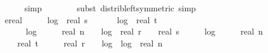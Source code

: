 \begin{isabellebody}
\ \ \ \ \ \ \isamarkupfalse%
\ {\isacharparenleft}{\kern0pt}simp{\isacharparenright}{\kern0pt}\isanewline
\ \ \ \ \ \ \isamarkupfalse%
\ {\isacharparenleft}{\kern0pt}subst\ distrib{\isacharunderscore}{\kern0pt}left{\isacharbrackleft}{\kern0pt}symmetric{\isacharbrackright}{\kern0pt}{\isacharcomma}{\kern0pt}\ simp{\isacharparenright}{\kern0pt}\ \isanewline
\ \ \ \ \isamarkupfalse%
\ \isamarkupfalse%
\ {\isachardoublequoteopen}{\isachardot}{\kern0pt}{\isachardot}{\kern0pt}{\isachardot}{\kern0pt}\ {\isasymle}\ ereal\ {\isacharparenleft}{\kern0pt}\ {}\ {\isacharplus}{\kern0pt}\ {}\ {\isacharasterisk}{\kern0pt}\ log\ {}\ {\isacharparenleft}{\kern0pt}real\ s\ {\isacharplus}{\kern0pt}\ {}{\isacharparenright}{\kern0pt}\ \ {\isacharplus}{\kern0pt}\ {}\ {\isacharasterisk}{\kern0pt}\ log\ {}\ {\isacharparenleft}{\kern0pt}real\ t\ {\isacharplus}{\kern0pt}\ {}{\isacharparenright}{\kern0pt}\ {\isacharplus}{\kern0pt}\ \isanewline
\ \ \ \ \ \ {}\ {\isacharasterisk}{\kern0pt}\ log\ {}\ {\isacharparenleft}{\kern0pt}{}\ {\isacharasterisk}{\kern0pt}\ {\isacharparenleft}{\kern0pt}{}{}\ {\isacharplus}{\kern0pt}\ real\ n{\isacharparenright}{\kern0pt}{\isacharparenright}{\kern0pt}\ {\isacharplus}{\kern0pt}\ {}\ {\isacharasterisk}{\kern0pt}\ log\ {}\ {\isacharparenleft}{\kern0pt}real\ r\ {\isacharplus}{\kern0pt}\ {}{\isacharparenright}{\kern0pt}\ {\isacharplus}{\kern0pt}\ real\ s\ {\isacharasterisk}{\kern0pt}\ {\isacharparenleft}{\kern0pt}{}\ {\isacharplus}{\kern0pt}\ {}\ {\isacharasterisk}{\kern0pt}\ log\ {}\ {\isacharparenleft}{\kern0pt}{}\ {\isacharasterisk}{\kern0pt}\ {\isacharparenleft}{\kern0pt}{}{}\ {\isacharplus}{\kern0pt}\ real\ n{\isacharparenright}{\kern0pt}{\isacharparenright}{\kern0pt}\ {\isacharplus}{\kern0pt}\ \isanewline
\ \ \ \ \ \ real\ t\ {\isacharasterisk}{\kern0pt}\ {\isacharparenleft}{\kern0pt}{}{}\ {\isacharplus}{\kern0pt}\ {\isacharparenleft}{\kern0pt}{}\ {\isacharasterisk}{\kern0pt}\ real\ r\ {\isacharplus}{\kern0pt}\ {}\ {\isacharasterisk}{\kern0pt}\ log\ {}\ {\isacharparenleft}{\kern0pt}log\ {}\ {\isacharparenleft}{\kern0pt}real\ n\ {\isacharplus}{\kern0pt}\ {}{\isacharparenright}{\kern0pt}{\isacharparenright}{\kern0pt}{\isacharparenright}{\kern0pt}{\isacharparenright}{\kern0pt}{\isacharparenright}{\kern0pt}{\isacharparenright}{\kern0pt}{\isachardoublequoteclose}\isanewline

\end{isabellebody}
